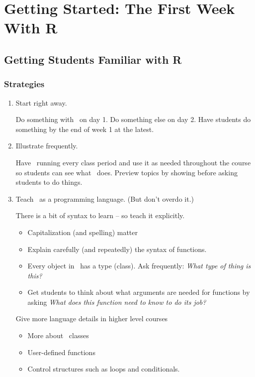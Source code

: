 \chapter{Getting Started: The First Week With R }









\section{Getting Students Familiar with R}

\subsection{Strategies}
\begin{enumerate}
\item
Start right away.

Do something with \R\ on day 1.  Do something else on day 2.  Have students do something by the end of week 1 at the latest.


\item Illustrate frequently.

Have \R\ running every class period and use it as needed throughout the course so students
can see what \R\ does.  Preview topics by showing before asking students to do things.

\item
Teach \R\ as a programming language. (But don't overdo it.)

There is a bit of syntax to learn -- so teach it explicitly.
\begin{itemize}
\item
Capitalization (and spelling) matter
\item
Explain carefully (and repeatedly) the syntax of functions.
\item
Every object in \R\ has a type (class).  Ask frequently: \emph{What type of thing is this?}
\item
Get students to think about what arguments are needed for functions by asking
\emph{What does this function need to know to do its job?}
\end{itemize}
Give more language details in higher level courses
\begin{itemize}
\item
More about \R\ classes
\item
User-defined functions
\item
Control structures such as loops and conditionals.
\end{itemize}


\end{enumerate}
